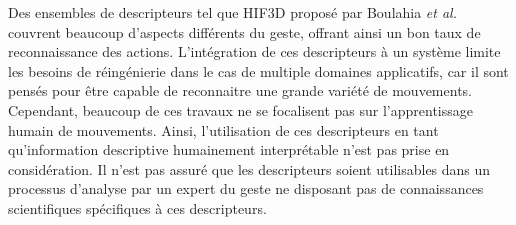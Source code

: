 Des ensembles de descripteurs tel que HIF3D proposé par Boulahia \textit{et al.} couvrent beaucoup d'aspects différents du geste, offrant ainsi un bon taux de reconnaissance des actions. L'intégration de ces descripteurs à un système limite les besoins de réingénierie dans le cas de multiple domaines applicatifs, car il sont pensés pour être capable de reconnaitre une grande variété de mouvements. Cependant, beaucoup de ces travaux ne se focalisent pas sur l'apprentissage humain de mouvements. Ainsi, l'utilisation de ces descripteurs en tant qu'information descriptive humainement interprétable n'est pas prise en considération. Il n'est pas assuré que les descripteurs soient utilisables dans un processus d'analyse par un expert du geste ne disposant pas de connaissances scientifiques spécifiques à ces descripteurs.



